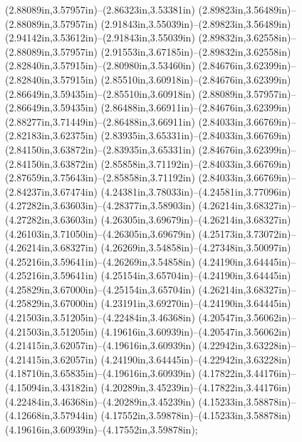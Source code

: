 (2.88089in,3.57957in)--(2.86323in,3.53381in) (2.89823in,3.56489in)--(2.88089in,3.57957in) (2.91843in,3.55039in)--(2.89823in,3.56489in) (2.94142in,3.53612in)--(2.91843in,3.55039in) (2.89832in,3.62558in)--(2.88089in,3.57957in) (2.91553in,3.67185in)--(2.89832in,3.62558in) (2.82840in,3.57915in)--(2.80980in,3.53460in) (2.84676in,3.62399in)--(2.82840in,3.57915in) (2.85510in,3.60918in)--(2.84676in,3.62399in) (2.86649in,3.59435in)--(2.85510in,3.60918in) (2.88089in,3.57957in)--(2.86649in,3.59435in) (2.86488in,3.66911in)--(2.84676in,3.62399in) (2.88277in,3.71449in)--(2.86488in,3.66911in) (2.84033in,3.66769in)--(2.82183in,3.62375in) (2.83935in,3.65331in)--(2.84033in,3.66769in) (2.84150in,3.63872in)--(2.83935in,3.65331in) (2.84676in,3.62399in)--(2.84150in,3.63872in) (2.85858in,3.71192in)--(2.84033in,3.66769in) (2.87659in,3.75643in)--(2.85858in,3.71192in) (2.84033in,3.66769in)--(2.84237in,3.67474in) (4.24381in,3.78033in)--(4.24581in,3.77096in) (4.27282in,3.63603in)--(4.28377in,3.58903in) (4.26214in,3.68327in)--(4.27282in,3.63603in) (4.26305in,3.69679in)--(4.26214in,3.68327in) (4.26103in,3.71050in)--(4.26305in,3.69679in) (4.25173in,3.73072in)--(4.26214in,3.68327in) (4.26269in,3.54858in)--(4.27348in,3.50097in) (4.25216in,3.59641in)--(4.26269in,3.54858in) (4.24190in,3.64445in)--(4.25216in,3.59641in) (4.25154in,3.65704in)--(4.24190in,3.64445in) (4.25829in,3.67000in)--(4.25154in,3.65704in) (4.26214in,3.68327in)--(4.25829in,3.67000in) (4.23191in,3.69270in)--(4.24190in,3.64445in) (4.21503in,3.51205in)--(4.22484in,3.46368in) (4.20547in,3.56062in)--(4.21503in,3.51205in) (4.19616in,3.60939in)--(4.20547in,3.56062in) (4.21415in,3.62057in)--(4.19616in,3.60939in) (4.22942in,3.63228in)--(4.21415in,3.62057in) (4.24190in,3.64445in)--(4.22942in,3.63228in) (4.18710in,3.65835in)--(4.19616in,3.60939in) (4.17822in,3.44176in)--(4.15094in,3.43182in) (4.20289in,3.45239in)--(4.17822in,3.44176in) (4.22484in,3.46368in)--(4.20289in,3.45239in) (4.15233in,3.58878in)--(4.12668in,3.57944in) (4.17552in,3.59878in)--(4.15233in,3.58878in) (4.19616in,3.60939in)--(4.17552in,3.59878in);

